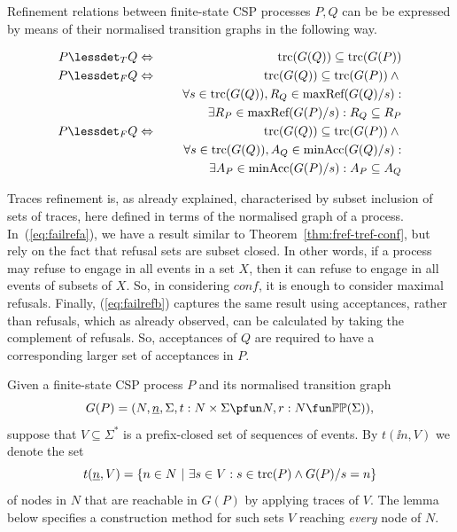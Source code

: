 Refinement relations between finite-state CSP processes $P, Q$ can be be
expressed by means of their normalised transition graphs in the following
way. %
%
\begin{lemma}
  \label{lemma:tgtrcref}
  \begin{eqnarray}
  P \lessdet_T Q & \Leftrightarrow & \trc(G(Q)) \subseteq\trc(G(P))
  \label{eq:trcrefa}
  \\
  \label{eq:failrefa}
  P \lessdet_F Q & \Leftrightarrow & \trc(G(Q)) \subseteq\trc(G(P)) \wedge {} \nonumber
  \\ & & \forall s\in\trc(G(Q)), R_Q\in\maxrefs(G(Q)/s):  \nonumber
  \\ & & \tabd
  \exists R_P\in\maxrefs(G(P)/s): R_Q\subseteq R_P
  \\
  \label{eq:failrefb}
  P \lessdet_F Q & \Leftrightarrow & \trc(G(Q)) \subseteq\trc(G(P)) \wedge {} \nonumber
  \\ & & \forall s\in\trc(G(Q)), A_Q\in\minaccs(G(Q)/s): \nonumber
  \\ & & \tabd
  \exists A_P\in\minaccs(G(P)/s): A_P\subseteq A_Q
  \end{eqnarray}
  \xbox
\end{lemma}
%
Traces refinement is, as already explained, characterised by subset inclusion
of sets of traces, here defined in terms of the normalised graph of a
process. In~(\ref{eq:failrefa}), we have a result similar to
Theorem~\ref{thm:fref-tref-conf}, but rely on the fact that refusal sets are
subset closed. In other words, if a process may refuse to engage in all
events in a set $X$, then it can refuse to engage in all events of subsets of
$X$. So, in considering $conf$, it is enough to consider maximal refusals.
Finally, (\ref{eq:failrefb}) captures the same result using acceptances,
rather than refusals, which as already observed, can be calculated by taking
the complement of refusals. So, acceptances of $Q$ are required to have a
corresponding larger set of acceptances in $P$.

Given a finite-state CSP process $P$ and its normalised transition graph
\[
G(P) = ( N, \ii n, \Sigma, t : N\times\Sigma \pfun N, r : N \fun \mathbb{P}\mathbb{P}(\Sigma)),
\]
suppose that $V\subseteq\Sigma^*$ is a
prefix-closed set  of sequences of events. By $t(\ii n,V)$ we denote the set
\[
t(\underline{n},V) = \{ n\in N~|~\exists s\in V: s\in\text{trc}(P)\wedge G(P)/s = n \}
\]
of nodes in $N$ that are reachable in $G(P)$ by applying traces of $V$. The
lemma below specifies a construction method for such sets $V$ reaching {\it
every} node of $N$.

